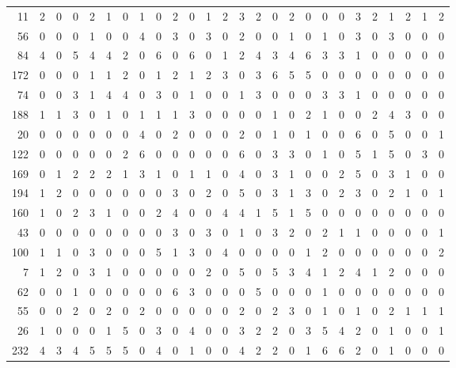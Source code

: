 \begin{longtable}{@{\extracolsep{\fill}}rccccccccccccccccccccccccc@{}}
11 & 2 & 0 & 0 & 2 & 1 & 0 & 1 & 0 & 2 & 0 & 1 & 2 & 3 & 2 & 0 & 2 & 0 & 0 & 0 & 3 & 2 & 1 & 2 & 1 & 2 \\
56 & 0 & 0 & 0 & 1 & 0 & 0 & 4 & 0 & 3 & 0 & 3 & 0 & 2 & 0 & 0 & 1 & 0 & 1 & 0 & 3 & 0 & 3 & 0 & 0 & 0 \\
84 & 4 & 0 & 5 & 4 & 4 & 2 & 0 & 6 & 0 & 6 & 0 & 1 & 2 & 4 & 3 & 4 & 6 & 3 & 3 & 1 & 0 & 0 & 0 & 0 & 0 \\
172 & 0 & 0 & 0 & 1 & 1 & 2 & 0 & 1 & 2 & 1 & 2 & 3 & 0 & 3 & 6 & 5 & 5 & 0 & 0 & 0 & 0 & 0 & 0 & 0 & 0 \\
74 & 0 & 0 & 3 & 1 & 4 & 4 & 0 & 3 & 0 & 1 & 0 & 0 & 1 & 3 & 0 & 0 & 0 & 3 & 3 & 1 & 0 & 0 & 0 & 0 & 0 \\
188 & 1 & 1 & 3 & 0 & 1 & 0 & 1 & 1 & 1 & 3 & 0 & 0 & 0 & 0 & 1 & 0 & 2 & 1 & 0 & 0 & 2 & 4 & 3 & 0 & 0 \\
20 & 0 & 0 & 0 & 0 & 0 & 0 & 4 & 0 & 2 & 0 & 0 & 0 & 2 & 0 & 1 & 0 & 1 & 0 & 0 & 6 & 0 & 5 & 0 & 0 & 1 \\
122 & 0 & 0 & 0 & 0 & 0 & 2 & 6 & 0 & 0 & 0 & 0 & 0 & 6 & 0 & 3 & 3 & 0 & 1 & 0 & 5 & 1 & 5 & 0 & 3 & 0 \\
169 & 0 & 1 & 2 & 2 & 2 & 1 & 3 & 1 & 0 & 1 & 1 & 0 & 4 & 0 & 3 & 1 & 0 & 0 & 2 & 5 & 0 & 3 & 1 & 0 & 0 \\
194 & 1 & 2 & 0 & 0 & 0 & 0 & 0 & 0 & 3 & 0 & 2 & 0 & 5 & 0 & 3 & 1 & 3 & 0 & 2 & 3 & 0 & 2 & 1 & 0 & 1 \\
160 & 1 & 0 & 2 & 3 & 1 & 0 & 0 & 2 & 4 & 0 & 0 & 4 & 4 & 1 & 5 & 1 & 5 & 0 & 0 & 0 & 0 & 0 & 0 & 0 & 0 \\
43 & 0 & 0 & 0 & 0 & 0 & 0 & 0 & 0 & 3 & 0 & 3 & 0 & 1 & 0 & 3 & 2 & 0 & 2 & 1 & 1 & 0 & 0 & 0 & 0 & 1 \\
100 & 1 & 1 & 0 & 3 & 0 & 0 & 0 & 5 & 1 & 3 & 0 & 4 & 0 & 0 & 0 & 0 & 1 & 2 & 0 & 0 & 0 & 0 & 0 & 0 & 2 \\
7 & 1 & 2 & 0 & 3 & 1 & 0 & 0 & 0 & 0 & 0 & 2 & 0 & 5 & 0 & 5 & 3 & 4 & 1 & 2 & 4 & 1 & 2 & 0 & 0 & 0 \\
62 & 0 & 0 & 1 & 0 & 0 & 0 & 0 & 0 & 6 & 3 & 0 & 0 & 0 & 5 & 0 & 0 & 0 & 1 & 0 & 0 & 0 & 0 & 0 & 0 & 0 \\
55 & 0 & 0 & 2 & 0 & 2 & 0 & 2 & 0 & 0 & 0 & 0 & 0 & 2 & 0 & 2 & 3 & 0 & 1 & 0 & 1 & 0 & 2 & 1 & 1 & 1 \\
26 & 1 & 0 & 0 & 0 & 1 & 5 & 0 & 3 & 0 & 4 & 0 & 0 & 3 & 2 & 2 & 0 & 3 & 5 & 4 & 2 & 0 & 1 & 0 & 0 & 1 \\
232 & 4 & 3 & 4 & 5 & 5 & 5 & 0 & 4 & 0 & 1 & 0 & 0 & 4 & 2 & 2 & 0 & 1 & 6 & 6 & 2 & 0 & 1 & 0 & 0 & 0 \\

\end{longtable}
